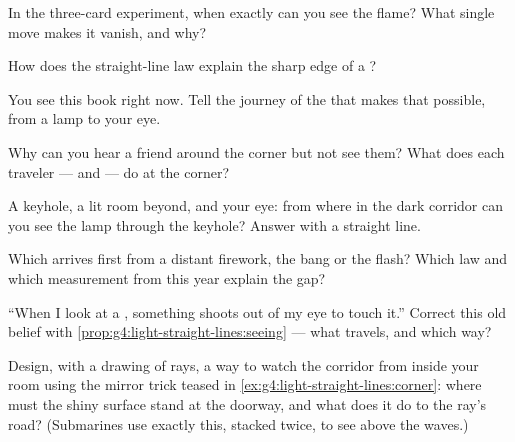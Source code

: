 \begin{exercise}[$\star$]\label{exo:g4:light-straight-lines:3}
In the three-card experiment, when exactly can you see the flame?
What single move makes it vanish, and why?
\end{exercise}

\begin{exercise}[$\star$]\label{exo:g4:light-straight-lines:4}
How does the straight-line law explain the sharp edge of a ?
\end{exercise}

\begin{exercise}[$\star$]\label{exo:g4:light-straight-lines:5}
You see this book right now. Tell the journey of the  that
makes that possible, from a lamp to your eye.
\end{exercise}

\begin{exercise}[$\star$]\label{exo:g4:light-straight-lines:6}
Why can you hear a friend around the corner but not see them? What
does each traveler ---  and  --- do at the corner?
\end{exercise}

\begin{exercise}[$\star$]\label{exo:g4:light-straight-lines:7}
A keyhole, a lit room beyond, and your eye: from where in the dark
corridor can you see the lamp through the keyhole? Answer with a
straight line.
\end{exercise}

\begin{exercise}[$\star$]\label{exo:g4:light-straight-lines:8}
Which arrives first from a distant firework, the bang or the
flash? Which law and which measurement from this year explain the
gap?
\end{exercise}

\begin{exercise}[$\star$]\label{exo:g4:light-straight-lines:9}
``When I look at a , something shoots out of my eye to touch
it.'' Correct this old belief with
\cref{prop:g4:light-straight-lines:seeing} --- what travels, and
which way?
\end{exercise}

\begin{exercise}[$\star\star$]\label{exo:g4:light-straight-lines:10}
Design, with a drawing of rays, a way to watch the corridor from
inside your room using the mirror trick teased in
\cref{ex:g4:light-straight-lines:corner}: where must the shiny
surface stand at the doorway, and what does it do to the ray's
road? (Submarines use exactly this, stacked twice, to see above
the waves.)
\end{exercise}


